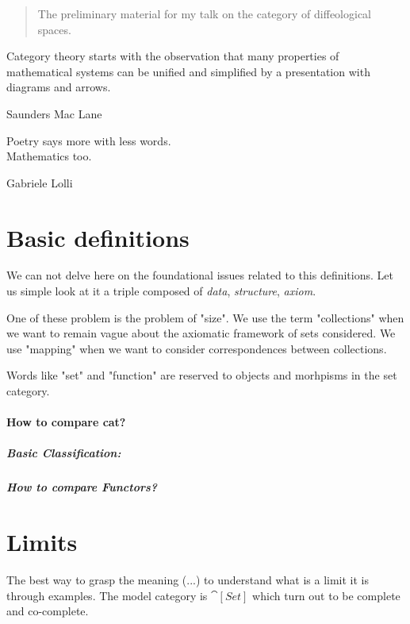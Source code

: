 \documentclass[a4paper,12pt,fleqn]{scrartcl}  %
\begin{document}
 
\begin{abstract}
	The preliminary material for my talk on the category of diffeological spaces.
\end{abstract}


\begin{appendices}
\epigraph{Category theory starts with the observation that many properties of mathematical systems can be unified and simplified by a presentation with diagrams and arrows.}{Saunders Mac Lane}
\epigraph{Poetry says more with less words.\\
Mathematics too.}{Gabriele Lolli}

\section{Basic definitions}
	
We can not delve here on the foundational issues related to this definitions. Let us simple look at it a triple composed of \emph{data}, \emph{structure}, \emph{axiom}.

One of these problem is the problem of "size". We use the term "collections" when we want to remain vague about the axiomatic framework of sets considered.
We use "mapping" when we want to consider correspondences between collections.

Words like "set" and "function" are reserved to objects and morhpisms in the set category.

\paragraph{How to compare cat?}
	

	\subparagraph{Basic Classification:}
	

\subparagraph{How to compare Functors?}
	

\section{Limits}
	
	The best way to grasp the meaning (...) to understand what is a limit it is through examples. The model category is $\cat[Set]$ which turn out to be complete and co-complete.
	



\end{appendices}
\end{document}

